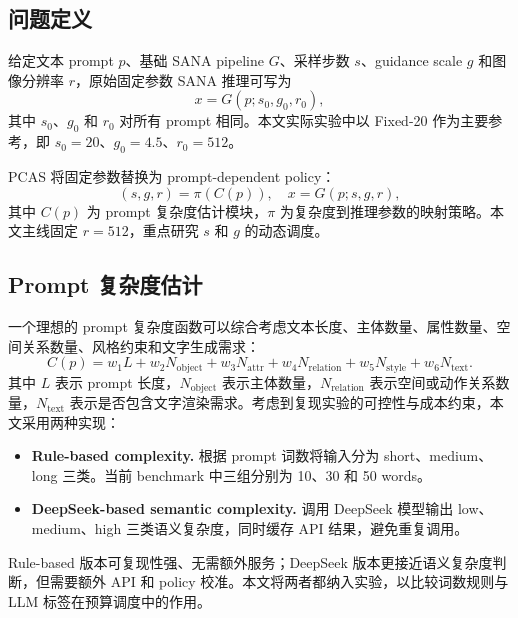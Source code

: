 \documentclass[UTF8,zihao=-4,fontset=fandol]{ctexart}
\begin{document}
\subsection{问题定义}

给定文本 prompt $p$、基础 SANA pipeline $G$、采样步数 $s$、guidance scale $g$ 和图像分辨率 $r$，原始固定参数 SANA 推理可写为
\begin{equation}
  x = G(p; s_0, g_0, r_0),
\end{equation}
其中 $s_0$、$g_0$ 和 $r_0$ 对所有 prompt 相同。本文实际实验中以 Fixed-20 作为主要参考，即 $s_0=20$、$g_0=4.5$、$r_0=512$。

PCAS 将固定参数替换为 prompt-dependent policy：
\begin{equation}
  (s, g, r) = \pi(C(p)), \quad x = G(p; s, g, r),
\end{equation}
其中 $C(p)$ 为 prompt 复杂度估计模块，$\pi$ 为复杂度到推理参数的映射策略。本文主线固定 $r=512$，重点研究 $s$ 和 $g$ 的动态调度。

\subsection{Prompt 复杂度估计}

一个理想的 prompt 复杂度函数可以综合考虑文本长度、主体数量、属性数量、空间关系数量、风格约束和文字生成需求：
\begin{equation}
 C(p)=w_1 L + w_2 N_{\mathrm{object}} + w_3 N_{\mathrm{attr}} + w_4 N_{\mathrm{relation}} + w_5 N_{\mathrm{style}} + w_6 N_{\mathrm{text}}.
\end{equation}
其中 $L$ 表示 prompt 长度，$N_{\mathrm{object}}$ 表示主体数量，$N_{\mathrm{relation}}$ 表示空间或动作关系数量，$N_{\mathrm{text}}$ 表示是否包含文字渲染需求。考虑到复现实验的可控性与成本约束，本文采用两种实现：

\begin{itemize}
  \item \textbf{Rule-based complexity.} 根据 prompt 词数将输入分为 short、medium、long 三类。当前 benchmark 中三组分别为 10、30 和 50 words。
  \item \textbf{DeepSeek-based semantic complexity.} 调用 DeepSeek 模型输出 low、medium、high 三类语义复杂度，同时缓存 API 结果，避免重复调用。
\end{itemize}

Rule-based 版本可复现性强、无需额外服务；DeepSeek 版本更接近语义复杂度判断，但需要额外 API 和 policy 校准。本文将两者都纳入实验，以比较词数规则与 LLM 标签在预算调度中的作用。
\end{document}
